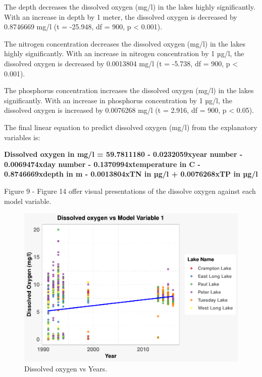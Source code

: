 \documentclass[12pt,]{article}
\begin{document}
The depth decreases the dissolved oxygen (mg/l) in the lakes highly
significantly. With an increase in depth by 1 meter, the dissolved
oxygen is decreased by 0.8746669 mg/l (t = -25.948, df = 900, p
\textless{} 0.001).

The nitrogen concentration decreases the dissolved oxygen (mg/l) in the
lakes highly significantly. With an increase in nitrogen concentration
by 1 µg/l, the dissolved oxygen is decreased by 0.0013804 mg/l (t =
-5.738, df = 900, p \textless{} 0.001).

The phosphorus concentration increases the dissolved oxygen (mg/l) in
the lakes significantly. With an increase in phosphorus concentration by
1 µg/l, the dissolved oxygen is increased by 0.0076268 mg/l (t = 2.916,
df = 900, p \textless{} 0.05).

The final linear equation to predict dissolved oxygen (mg/l) from the
explanatory variables is:

\textbf{Dissolved oxygen in mg/l = 59.7811180 - 0.0232059xyear number -
0.0069474xday number - 0.1370994xtemperature in C - 0.8746669xdepth in m
- 0.0013804xTN in µg/l + 0.0076268xTP in µg/l}

Figure 9 - Figure 14 offer visual presentations of the dissolve oxygen
against each model variable.

\begin{figure}
\centering
\includegraphics{Eadala_ENV872_Project_files/figure-latex/fig9-1.pdf}
\caption{Dissolved oxygen vs Years.}
\end{figure}
\end{document}
